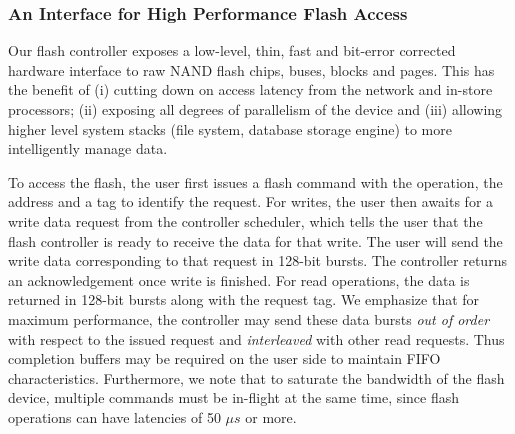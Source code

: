 \subsubsection{An Interface for High Performance Flash Access}
 Our flash controller exposes a low-level, thin,
fast and bit-error corrected hardware interface to raw NAND flash chips, buses,
blocks and pages. This has the benefit of (i) cutting down on access latency
from the network and in-store processors; (ii) exposing all degrees of
parallelism of the device and (iii) allowing higher level system stacks (file
system, database storage engine) to more intelligently manage data. 

To access the flash, the user first issues a flash command
with the operation, the address and a tag to identify the request.
For writes, the user then awaits for a write data request from
the controller scheduler, which tells the user that the flash controller is
ready to receive the data for that write. The user will send the write data
corresponding to that request in 128-bit bursts. The controller returns an
acknowledgement once write is finished. 
For read operations, the data is returned in 128-bit bursts along with the request tag.
We emphasize that for maximum performance, the
controller may send these data bursts \emph{out of order} with respect to
the issued request and \emph{interleaved} with other read requests.
Thus completion buffers may be required on the user side to maintain FIFO
characteristics. Furthermore,
we note that to saturate the bandwidth of the flash device, multiple
commands must be in-flight at the same time, since flash operations
can have latencies of 50 $\mu s$ or more. 



